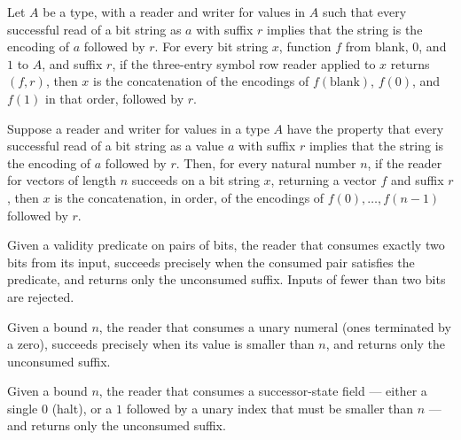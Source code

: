 \begin{lemma}
\label{Turing.codeReadSymbols_sound}
\leanok
{}
Let $A$ be a type, with a reader and writer for values in $A$ such that every successful
read of a bit string as $a$ with suffix $r$ implies that the string is the encoding of
$a$ followed by $r$. For every bit string $x$, function $f$ from blank, $0$, and $1$ to
$A$, and suffix $r$, if the three-entry symbol row reader applied to $x$ returns
$(f,r)$, then $x$ is the concatenation of the encodings of $f(\text{blank})$, $f(0)$,
and $f(1)$ in that order, followed by $r$.
\end{lemma}

\begin{lemma}
\label{Turing.codeReadVec_sound}
\leanok
{}
Suppose a reader and writer for values in a type $A$ have the property that every
successful read of a bit string as a value $a$ with suffix $r$ implies that the string
is the encoding of $a$ followed by $r$. Then, for every natural number $n$, if the
reader for vectors of length $n$ succeeds on a bit string $x$, returning a vector $f$
and suffix $r$, then $x$ is the concatenation, in order, of the encodings of
$f(0),\ldots,f(n-1)$ followed by $r$.
\end{lemma}

\begin{definition}
\label{Turing.codeSkipPair}
\leanok
Given a validity predicate on pairs of bits, the reader that consumes exactly
two bits from its input, succeeds precisely when the consumed pair satisfies
the predicate, and returns only the unconsumed suffix.  Inputs of fewer than
two bits are rejected.
\end{definition}

\begin{definition}
\label{Turing.codeSkipFin}
\leanok
{}
Given a bound $n$, the reader that consumes a unary numeral (ones terminated by
a zero), succeeds precisely when its value is smaller than $n$, and returns
only the unconsumed suffix.
\end{definition}

\begin{definition}
\label{Turing.codeSkipState}
\leanok
{}
Given a bound $n$, the reader that consumes a successor-state field --- either
a single $0$ (halt), or a $1$ followed by a unary index that must be smaller
than $n$ --- and returns only the unconsumed suffix.
\end{definition}

